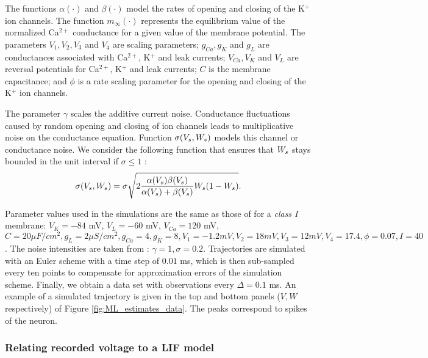  The functions $\alpha (\cdot )$ and $\beta (\cdot )$ model the rates of opening
 and closing of the K$^+$ ion channels. The function $m_{\infty}(\cdot)$
 represents the  equilibrium value of the normalized Ca$^{2+}$ conductance for a
 given value of the membrane potential. The parameters $V_1, V_2, V_3$ and $V_4$
 are scaling  parameters; $g_{Ca}, g_K$ and $g_L$ are conductances associated
 with Ca$^{2+}$, K$^{+}$ and leak currents; $V_{Ca}, V_K$ and $V_L$ are reversal
 potentials for Ca$^{2+}$, K$^+$ and leak currents; $C$ is the membrane
 capacitance; and $\phi$ is a rate scaling parameter for the opening and closing of
 the K$^+$ ion channels.
 
The parameter $\gamma$ scales the additive current noise. Conductance
fluctuations caused by random opening and closing of ion channels leads to
multiplicative noise on the conductance equation. Function $\sigma({ V_s },{ W_s })$
models this channel or conductance noise. We consider the following function
that ensures that ${ W_s }$ stays bounded in the unit interval  if $\sigma \leq 1$
\cite{DitlevsenGreenwood2013}: $$\sigma({ V_s }, { W_s } ) = \sigma \sqrt{2
\frac{\alpha({ V_s }) \beta({ V_s })}{\alpha({ V_s })+ \beta({ V_s })} { W_s } (1-{ W_s })}. $$

Parameter values used in the simulations are
the same as those of 
\cite{RinzelErmentrout1989,TatenoPakdaman2004} for a {\sl class I}
membrane: $V_K = -84$ mV, $V_L = -60$ mV, $V_{Ca} = 120$ mV, $C = 20 \mu
F/cm^2, 
g_L = 2 \mu S/cm^2, g_{Ca} = 4, g_K = 8, 
V_1 = -1.2 mV, V_2 = 18 mV,
V_3 = 12 mV, V_4 = 17.4,\phi = 0.07, I = 40$. The noise intensities
are taken from \cite{DitlevsenSamson2014}:  
$\gamma = 1, \sigma = 0.2$. 
Trajectories are simulated with an Euler scheme with a time step of
$0.01$ ms, which is then sub-sampled every ten points to compensate
for approximation errors of the simulation scheme. Finally, we obtain a data
set with observations every $\Delta = 0.1$ ms.  An example
of a simulated trajectory is given in the top and bottom panels ($V,W$
respectively) of Figure \ref{fig:ML_estimates_data}. The peaks correspond
to spikes of the neuron. 

\subsubsection{Relating recorded voltage to a LIF model}

\def \ss {S_{sp}} \def \ts {T_{sp}} \def \yreset {y_r}
\def \yth {y_{th}} 
\def \s {\sigma} \def \b {\beta} \def \a {\alpha}
\def \tc {\tau_c} \def \meanI {\bar T}
\def \vreset {v_r}
\def \vth {v_{th}} 

